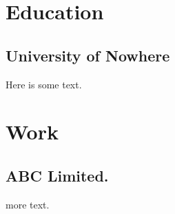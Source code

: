 \documentclass{castlecv}
\begin{document}
\section{Education}
\subsection{University of Nowhere}
Here is some text.

\section{Work}
\subsection{ABC Limited.}
more text.
\end{document}
